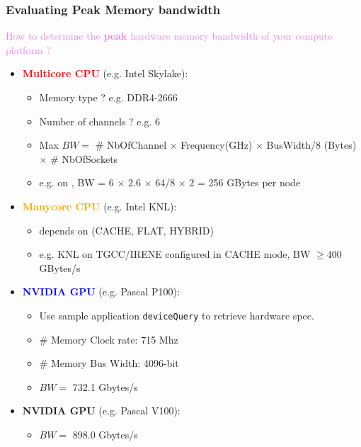 \begin{frame}
  \frametitle{Evaluating Peak Memory bandwidth}

  \textcolor{violet}{\Large How to determine the {\bf peak} hardware memory bandwidth of your compute platform ?}

  \begin{itemize}
  \item \textcolor{red}{\bf Multicore CPU} (e.g. Intel Skylake):
    \begin{itemize}
    \item Memory type ? e.g. DDR4-2666
    \item Number of channels ? e.g. 6
    \item Max $BW =$ \# NbOfChannel $\times$ Frequency(GHz) $\times$ BusWidth/8 (Bytes) $\times$ \# NbOfSockets
    \item e.g. on , BW = 6 $\times$ 2.6 $\times$ 64/8 $\times$ 2 = 256 GBytes per node
    \end{itemize}
  \item \textcolor{orange}{\bf Manycore CPU} (e.g. Intel KNL):
    \begin{itemize}
    \item depends on  (CACHE, FLAT, HYBRID)
    \item e.g. KNL on TGCC/IRENE configured in CACHE mode, BW $\geqslant 400$ GBytes/s
    \end{itemize}
  \item \textcolor{blue}{\bf NVIDIA GPU} (e.g. Pascal P100):
    \begin{itemize}
    \item Use sample application {\tt deviceQuery} to retrieve hardware spec.
    \item \# Memory Clock rate:  715 Mhz
    \item \# Memory Bus Width:   4096-bit
    \item $BW =$ 732.1 Gbytes/s
    \end{itemize}
  \item \textcolor{RoyalPurple}{\bf NVIDIA GPU} (e.g. Pascal V100):
    \begin{itemize}
    \item $BW =$ 898.0 Gbytes/s
    \end{itemize}
  \end{itemize}

  
\end{frame}

